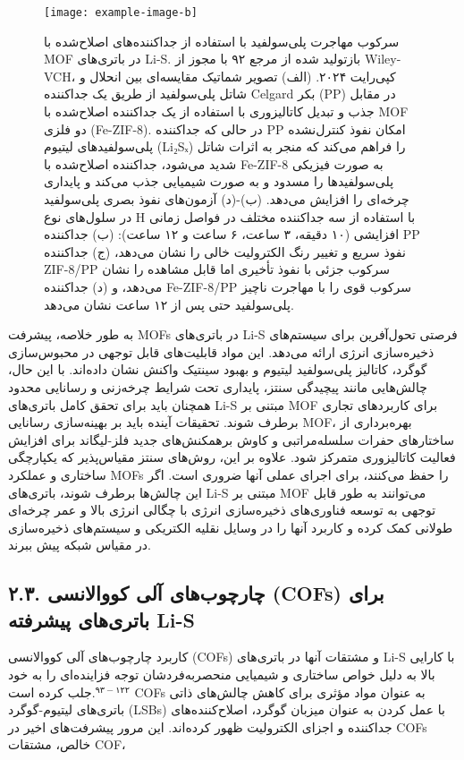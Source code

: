 \documentclass[12pt,a4paper,twocolumn]{article} %
\newcommand{\persian}[1]{\textfarsi{#1}}
\newcommand{\english}[1]{\textenglish{#1}}
\newcommand{\farsibold}[1]{{\farsifontbold{#1}}}
\begin{document}
\begin{figure*}[t]
    \centering
    \texttt{[image: example-image-b]} %
    \caption{\persian{
    \farsibold{شکل ۷.} سرکوب مهاجرت پلی‌سولفید با استفاده از جداکننده‌های اصلاح‌شده با \english{MOF} در باتری‌های \english{Li-S}. بازتولید شده از مرجع ۹۲ با مجوز از \english{Wiley-VCH}، کپی‌رایت ۲۰۲۴. (الف) تصویر شماتیک مقایسه‌ای بین انحلال و شاتل پلی‌سولفید از طریق یک جداکننده \english{Celgard} بکر (\english{PP}) در مقابل جذب و تبدیل کاتالیزوری با استفاده از یک جداکننده اصلاح‌شده با \english{MOF} دو فلزی (\english{Fe-ZIF-8}). در حالی که جداکننده \english{PP} امکان نفوذ کنترل‌نشده پلی‌سولفیدهای لیتیوم (\english{Li₂Sₓ}) را فراهم می‌کند که منجر به اثرات شاتل شدید می‌شود، جداکننده اصلاح‌شده با \english{Fe-ZIF-8} به صورت فیزیکی پلی‌سولفیدها را مسدود و به صورت شیمیایی جذب می‌کند و پایداری چرخه‌ای را افزایش می‌دهد. (ب)-(د) آزمون‌های نفوذ بصری پلی‌سولفید در سلول‌های نوع \english{H} با استفاده از سه جداکننده مختلف در فواصل زمانی افزایشی (۱۰ دقیقه، ۳ ساعت، ۶ ساعت و ۱۲ ساعت): (ب) جداکننده \english{PP} نفوذ سریع و تغییر رنگ الکترولیت خالی را نشان می‌دهد، (ج) جداکننده \english{ZIF-8/PP} سرکوب جزئی با نفوذ تأخیری اما قابل مشاهده را نشان می‌دهد، و (د) جداکننده \english{Fe-ZIF-8/PP} سرکوب قوی را با مهاجرت ناچیز پلی‌سولفید حتی پس از ۱۲ ساعت نشان می‌دهد.
    }}
    \label{fig:7}
\end{figure*}

\persian{
به طور خلاصه، پیشرفت \english{MOFs} در باتری‌های \english{Li-S} فرصتی تحول‌آفرین برای سیستم‌های ذخیره‌سازی انرژی ارائه می‌دهد. این مواد قابلیت‌های قابل توجهی در محبوس‌سازی گوگرد، کاتالیز پلی‌سولفید لیتیوم و بهبود سینتیک واکنش نشان داده‌اند. با این حال، چالش‌هایی مانند پیچیدگی سنتز، پایداری تحت شرایط چرخه‌زنی و رسانایی محدود همچنان باید برای تحقق کامل باتری‌های \english{Li-S} مبتنی بر \english{MOF} برای کاربردهای تجاری برطرف شوند. تحقیقات آینده باید بر بهینه‌سازی رسانایی \english{MOF}، بهره‌برداری از ساختارهای حفرات سلسله‌مراتبی و کاوش برهمکنش‌های جدید فلز-لیگاند برای افزایش فعالیت کاتالیزوری متمرکز شود. علاوه بر این، روش‌های سنتز مقیاس‌پذیر که یکپارچگی ساختاری و عملکرد \english{MOFs} را حفظ می‌کنند، برای اجرای عملی آنها ضروری است. اگر این چالش‌ها برطرف شوند، باتری‌های \english{Li-S} مبتنی بر \english{MOF} می‌توانند به طور قابل توجهی به توسعه فناوری‌های ذخیره‌سازی انرژی با چگالی انرژی بالا و عمر چرخه‌ای طولانی کمک کرده و کاربرد آنها را در وسایل نقلیه الکتریکی و سیستم‌های ذخیره‌سازی در مقیاس شبکه پیش ببرند.
}

\subsection*{\persian{۲.۳. چارچوب‌های آلی کووالانسی (\english{COFs}) برای باتری‌های پیشرفته \english{Li-S}}}
\persian{
کاربرد چارچوب‌های آلی کووالانسی (\english{COFs}) و مشتقات آنها در باتری‌های \english{Li-S} با کارایی بالا به دلیل خواص ساختاری و شیمیایی منحصربه‌فردشان توجه فزاینده‌ای را به خود جلب کرده است.$^{۹۳-۱۲۲}$ \english{COFs} به عنوان مواد مؤثری برای کاهش چالش‌های ذاتی باتری‌های لیتیوم-گوگرد (\english{LSBs}) با عمل کردن به عنوان میزبان گوگرد، اصلاح‌کننده‌های جداکننده و اجزای الکترولیت ظهور کرده‌اند. این مرور پیشرفت‌های اخیر در \english{COFs} خالص، مشتقات \english{COF}،
}
\end{document}
